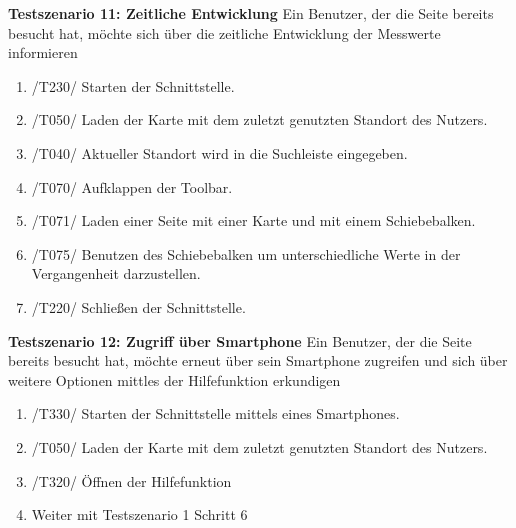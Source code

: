 \textbf{Testszenario 11: Zeitliche Entwicklung}
\newline
Ein Benutzer, der die Seite bereits besucht hat, möchte sich über die zeitliche Entwicklung der Messwerte informieren
\begin{enumerate} [noitemsep]
    \item /T230/ Starten der Schnittstelle.
    \item /T050/ Laden der Karte mit dem zuletzt genutzten Standort des Nutzers.
    \item /T040/ Aktueller Standort wird in die Suchleiste eingegeben.
    \item /T070/ Aufklappen der \gls{Toolbar}.
    \item /T071/ Laden einer Seite mit einer Karte und mit einem Schiebebalken. 
    \item /T075/ Benutzen des Schiebebalken um unterschiedliche Werte in der Vergangenheit darzustellen.
    \item /T220/ Schließen der Schnittstelle.
\end{enumerate}

\textbf{Testszenario 12: Zugriff über Smartphone}
\newline
Ein Benutzer, der die Seite bereits besucht hat, möchte erneut über sein Smartphone zugreifen und sich über weitere Optionen mittles der Hilfefunktion erkundigen
\begin{enumerate} [noitemsep]
    \item /T330/ Starten der Schnittstelle mittels eines Smartphones.
    \item /T050/ Laden der Karte mit dem zuletzt genutzten Standort des Nutzers.
    \item /T320/ Öffnen der Hilfefunktion 
    \item Weiter mit Testszenario 1 Schritt 6
\end{enumerate}
